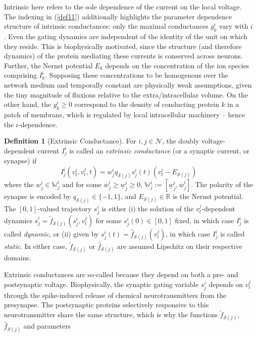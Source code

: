 \documentclass[12pt, oneside]{report}
\newcommand{\mbb}[1]{\mathbb{#1}}
\newcommand{\1}[1]{\mathbbm{1}_{\{#1\}}}
\newcommand{\mc}[1]{\mathcal{#1}}
\newcommand*{\td}[1]{\overset{\bm .}{#1}}
\theoremstyle{definition}
\newtheorem{definition}[theorem]{Definition}
\begin{document}
Intrinsic here refers to the sole dependence of the current on the local
voltage. The indexing in (\ref{def11}) additionally highlights the parameter
dependence structure of intrinsic conductances: only the maximal conductances
$g^i_k$ vary with $i$. Even the gating dynamics are independent of the identity
of the unit on which they reside. This is biophysically motivated, since the
structure (and therefore dynamics) of the protein mediating these currents is
conserved across neurons. Further, the Nernst potential $E_k$ depends on the
concentration of the ion species comprising $I^i_k$. Supposing these
concentrations to be homogenous over the network medium and temporally constant
are physically weak assumptions, given the tiny magnitude of fluxions relative
to the extra/intracellular volume. On the other hand, the $g^i_k\geq0$
correspond to the density of conducting protein $k$ in a patch of membrane,
which is regulated by local intracellular machinery -- hence the $i$-dependence.
\begin{definition}[Extrinsic Conductance]\label{def13} For $i,j\in\mc{N}$, the
    doubly voltage-dependent current $I^i_j$ is called an {\it extrinsic
    conductance} (or a synaptic current, or synapse) if
    \[I^i_j(v^i_t,v^j_t,t)=w^i_jq_{\mc{S}(j)}s^i_j(t)(v^i_t-E_{\mc{S}(j)})\]
    where the $w^i_j\in\mbb{W}^i_j$ and for some
    $\overline{w}^i_j\geq\underline{w}^i_j\geq 0$,
    $\mbb{W}^i_j:=[\underline{w}^i_j,\overline{w}^i_j]$. The polarity of the
    synapse is encoded by $q_{\mc{S}(j)}\in\{-1,1\}$, and
    $E_{\mc{S}(j)}\in\mbb{R}$ is the Nernst potential. The $[0,1]$-valued
    trajectory $s^i_j$ is either (i) the solution of the $v^j_t$-dependent
    dynamics $\td{s}^i_j=\widetilde{f}_{\mc{S}(j)}(s^i_j,v^j_t)$ for some
    $s^i_j(0)\in[0,1]$ fixed, in which case $I^i_j$ is called {\it dynamic}, or
    (ii) given by $s^i_j(t)=\widehat{f}_{\mc{S}(j)}(v^j_t)$, in which case
    $I^i_j$ is called {\it static}. In either case, $\widetilde{f}_{\mc{S}(j)}$
    or $\widehat{f}_{\mc{S}(j)}$ are assumed Lipschitz on their respective
    domains.
\end{definition}
Extrinsic conductances are so-called because they depend on both a pre- and
postsynaptic voltage. Biophysically, the synaptic gating variable $s^i_j$
depends on $v^j_t$ through the spike-induced release of chemical
neurotransmitters from the presynapse. The postsynaptic proteins selectively
responsive to this neurotransmitter share the same structure, which is why the
functions $\widetilde{f}_{\mc{S}(j)}$, $\widehat{f}_{\mc{S}(j)}$ and parameters
\end{document}
